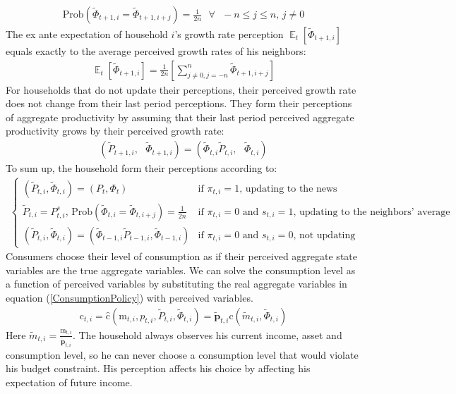 \documentclass[12pt,letterpaper]{article}
\DeclareMathOperator{\E}{\mathbb{E}}
\begin{document}
\begin{eqnarray}
\text{Prob}(\tilde{\Phi}_{t+1,i}=\tilde{\Phi}_{t+1,i+j})=\frac{1}{2n}\text{  }\forall\text{ }-n\leq j\leq n\text{, }j\neq0
\end{eqnarray}
The ex ante expectation of household $i$'s growth rate perception $\E_{t}\left[\tilde{\Phi}_{t+1,i}\right]$ equals exactly to the average perceived growth rates of his neighbors:
\begin{eqnarray}
\E_{t}\left[\tilde{\Phi}_{t+1,i}\right]=\frac{1}{2n}\left[\sum_{j\neq0,j=-n}^{n}\tilde{\Phi}_{t+1,i+j}\right]
\end{eqnarray}
For households that do not update their perceptions, their perceived growth rate does not change from their last period perceptions. They form their perceptions of aggregate productivity by assuming that their last period perceived aggregate productivity grows by their perceived growth rate:
\begin{eqnarray}
(\tilde{P}_{t+1,i},\text{ }\tilde{\Phi}_{t+1,i})=(\tilde{\Phi}_{t,i}\tilde{P}_{t,i},\text{ }\tilde{\Phi}_{t,i})
\end{eqnarray}
To sum up, the household form their perceptions according to:
\begin{eqnarray*}
	\begin{cases}
		(\tilde{P}_{t,i},\tilde{\Phi}_{t,i})=(P_{t},\Phi_{t})  & \text{if $\pi_{t,i}=1$, updating to the news}\\
		\tilde{P}_{t,i}=P^{s}_{t,i}\text{, Prob}(\tilde{\Phi}_{t,i}=\tilde{\Phi}_{t,i+j})=\frac{1}{2n} & \text{if $\pi_{t,i}=0\text{ and }s_{t,i}=1$, updating to the neighbors' average}\\
		(\tilde{P}_{t,i},\tilde{\Phi}_{t,i})=(\tilde{\Phi}_{t-1,i}\tilde{P}_{t-1,i},\tilde{\Phi}_{t-1,i}) & \text{if $\pi_{t,i}=0\text{ and }s_{t,i}=0$, not updating}
	\end{cases}
\end{eqnarray*}
Consumers choose their level of consumption as if their perceived aggregate state variables are the true aggregate variables. We can solve the consumption level as a function of perceived variables by substituting the real aggregate variables in equation (\ref{ConsumptionPolicy}) with perceived variables.
\begin{eqnarray}
\pmb{\mathrm{c}}_{t,i}=\hat{\pmb{\mathrm{c}}}(\pmb{\mathrm{m}}_{t,i},p_{t,i},\tilde{P}_{t,i},\tilde{\Phi}_{t,i})=\tilde{\pmb{p}}_{t,i}\mathrm{c}(\tilde{m}_{t,i},\tilde{\Phi}_{t,i})
\end{eqnarray}
Here $\tilde{m}_{t,i}=\frac{\pmb{\mathrm{m}}_{t,i}}{\tilde{\pmb{p}}_{t,i}}$. The household always observes his current income, asset and consumption level, so he can never choose a consumption level that would violate his budget constraint. His perception affects his choice by affecting his expectation of future income.
\end{document}
